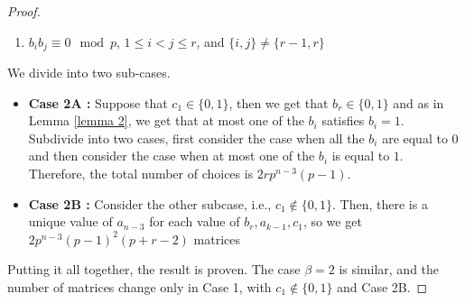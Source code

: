 \documentclass[10pt,a4paper]{amsart}
\begin{document}
\begin{proof}
\begin{enumerate}
\item $b_ib_j \equiv 0 \mod p$, $1 \leq i < j \leq r$, and $\{i,j\} \neq \{r-1,r\}$
\end{enumerate}
We divide into two sub-cases.
\begin{itemize}
    \item \textbf{Case 2A :} Suppose that $c_1 \in \{0,1\}$, then we get that $b_r \in \{0,1\}$ and as in Lemma \ref{lemma 2}, we get that at most one of the $b_i$ satisfies $b_i=1$. Subdivide into two cases, first consider the case when all the $b_i$ are equal to $0$ and then consider the case when at most one of the $b_i$ is equal to $1$. Therefore, the total number of choices is $2rp^{n-3}(p-1)$.
    \item \textbf{Case 2B :} Consider the other subcase, i.e., $c_1 \notin \{0,1\}$. Then, there is a unique value of $a_{n-3}$ for each value of $b_r, a_{k-1}, c_1$, so we get $2p^{n-3}(p-1)^2(p+r-2)$ matrices
\end{itemize}
Putting it all together, the result is proven. The case $\beta = 2$ is similar, and the number of matrices change only in Case 1, with $c_1\notin \{0,1\}$ and Case 2B.
\end{proof}
\end{document}
